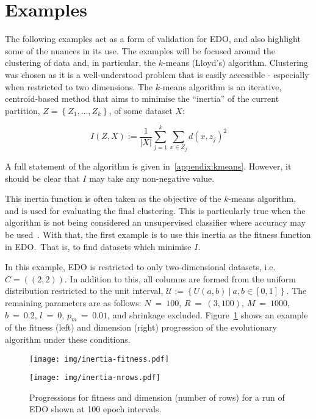 \section{Examples}\label{section:examples}

The following examples act as a form of validation for EDO, and also highlight
some of the nuances in its use. The examples will be focused around the
clustering of data and, in particular, the \(k\)-means (Lloyd's) algorithm.
Clustering was chosen as it is a well-understood problem that is easily
accessible \-- especially when restricted to two dimensions. The \(k\)-means
algorithm is an iterative, centroid-based method that aims to minimise the
``inertia'' of the current partition, \(Z = \left\{Z_1, \ldots, Z_k\right\}\),
of some dataset \(X\):

\[
    I(Z, X) := \frac{1}{|X|} \sum_{j=1}^{k} \sum_{x \in Z_j} {d(x, z_j)}^2
\]

A full statement of the algorithm is given in~\ref{appendix:kmeans}. However, it
should be clear that \(I\) may take any non-negative value.

This inertia function is often taken as the objective of the \(k\)-means
algorithm, and is used for evaluating the final clustering. This is particularly
true when the algorithm is not being considered an unsupervised classifier where
accuracy may be used~\cite{Huang1998}. With that, the first example is to use
this inertia as the fitness function in EDO.\ That is, to find datasets which
minimise \(I\).

In this example, EDO is restricted to only two-dimensional datasets, i.e.\ \(C =
\left((2, 2)\right)\). In addition to this, all columns are formed from the
uniform distribution restricted to the unit interval, \(\mathcal{U} :=
\left\{U(a, b)~|~a, b \in [0, 1]\right\}\). The remaining parameters are as
follows: \(N~=~100\), \(R~=~(3, 100)\), \(M~=~1000\), \(b~=~0.2\), \(l~=~0\),
\(p_m~=~0.01\), and shrinkage excluded. Figure~\ref{figure:inertia} shows an
example of the fitness (left) and dimension (right) progression of the
evolutionary algorithm under these conditions.

\begin{figure}[htbp]
    \centering
    \begin{minipage}{\imgwidth}
        \centering
        \texttt{[image: img/inertia-fitness.pdf]}
    \end{minipage}

    \begin{minipage}{\imgwidth}
        \centering
        \texttt{[image: img/inertia-nrows.pdf]}
    \end{minipage}
    \caption{Progressions for fitness and dimension (number of rows) for a run
             of EDO shown at 100 epoch intervals.}\label{figure:inertia}
\end{figure}

